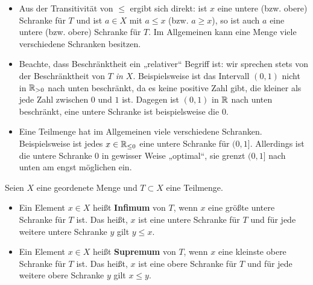 \begin{bem} \quad
    \begin{itemize}
        \item Aus der Transitivität von $\le$ ergibt sich direkt: ist $x$ eine untere (bzw. obere) Schranke für $T$ und ist $a\in X$ mit $a\le x$ (bzw. $a\ge x$), so ist auch $a$ eine untere (bzw. obere) Schranke für $T$. Im Allgemeinen kann eine Menge viele verschiedene Schranken besitzen.
        \item Beachte, dass Beschränktheit ein „relativer“ Begriff ist: wir sprechen stets von der Beschränktheit von $T$ \emph{in $X$}. Beispielsweise ist das Intervall $(0,1)$ nicht in $\mathbb R_{>0}$ nach unten beschränkt, da es keine positive Zahl gibt, die kleiner als jede Zahl zwischen $0$ und $1$ ist. Dagegen ist $(0,1)$ in $\mathbb R$ nach unten beschränkt, eine untere Schranke ist beispielsweise die $0$.
        \item Eine Teilmenge hat im Allgemeinen viele verschiedene Schranken. Beispielsweise ist jedes $x\in \mathbb R_{\le 0}$ eine untere Schranke für $(0,1]$. Allerdings ist die untere Schranke $0$ in gewisser Weise „optimal“, sie grenzt $(0,1]$ nach unten am engst möglichen ein.
    \end{itemize}
\end{bem}


\begin{defin}  
    Seien $X$ eine geordenete Menge und $T\subset X$ eine Teilmenge.
    \begin{itemize}
        \item Ein Element $x\in X$ heißt \textbf{Infimum} von $T$, wenn $x$ eine größte untere Schranke für $T$ ist. Das heißt, $x$ ist eine untere Schranke für $T$ und für jede weitere untere Schranke $y$ gilt $y\le x$.
        \item Ein Element $x\in X$ heißt \textbf{Supremum} von $T$, wenn $x$ eine kleinste obere Schranke für $T$ ist. Das heißt, $x$ ist eine obere Schranke für $T$ und für jede weitere obere Schranke $y$ gilt $x\le y$.
    \end{itemize}
\end{defin}


